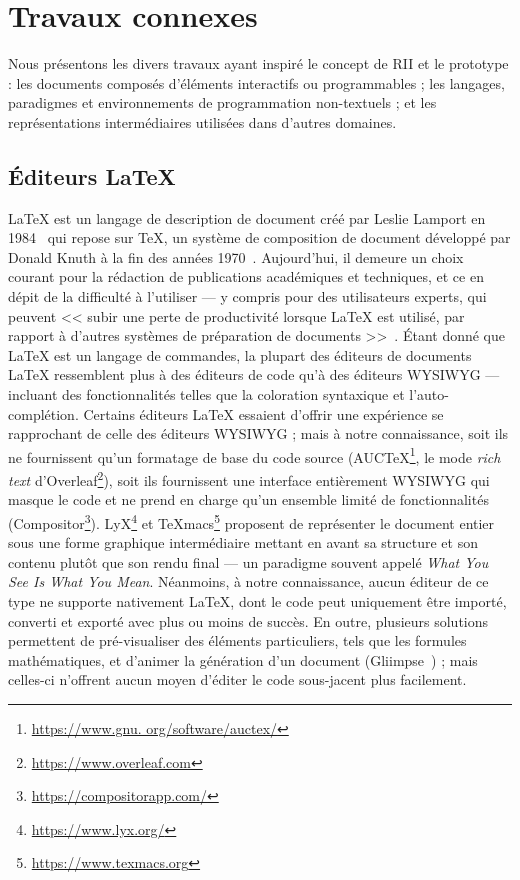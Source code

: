 
\section{Travaux connexes}
\label{sec:travaux-connexes}

Nous présentons les divers travaux ayant inspiré le concept de RII et le prototype \iLaTeX{} : les documents composés d'éléments interactifs ou programmables ; les langages, paradigmes et environnements de programmation non-textuels ; et les représentations intermédiaires utilisées dans d'autres domaines.


\subsection{Éditeurs \LaTeX{}}

\LaTeX{} est un langage de description de document créé par Leslie Lamport en 1984~\cite{lamport1994latex} qui repose sur \TeX{}, un système de composition de document développé par Donald Knuth à la fin des années 1970~\cite{knuth1984texbook}.
Aujourd'hui, il demeure un choix courant pour la rédaction de publications académiques et techniques, et ce en dépit de la difficulté à l'utiliser --- y compris pour des utilisateurs experts, qui peuvent << subir une perte de productivité lorsque \LaTeX{} est utilisé, par rapport à d'autres systèmes de préparation de documents >>~\cite{knauff2014efficiency}.
Étant donné que \LaTeX{} est un langage de commandes, la plupart des éditeurs de documents \LaTeX{} ressemblent plus à des éditeurs de code qu'à des éditeurs WYSIWYG --- incluant des fonctionnalités telles que la coloration syntaxique et l'auto-complétion.
Certains éditeurs \LaTeX{} essaient d'offrir une expérience se rapprochant de celle des éditeurs WYSIWYG ; mais à notre connaissance, soit ils ne fournissent qu'un formatage de base du code source (\eg AUC\TeX{}\footnote{\url{https://www.gnu. org/software/auctex/}}, le mode \emph{rich text} d'Overleaf\footnote{\url{https://www.overleaf.com}}), soit ils fournissent une interface entièrement WYSIWYG qui masque le code et ne prend en charge qu'un ensemble limité de fonctionnalités (\eg Compositor\footnote{\url{https://compositorapp.com/}}).
LyX\footnote{\url{https://www.lyx.org/}} et TeXmacs\footnote{\url{https://www.texmacs.org}} proposent de représenter le document entier sous une forme graphique intermédiaire mettant en avant sa structure et son contenu plutôt que son rendu final --- un paradigme souvent appelé \emph{What You See Is What You Mean}.
Néanmoins, à notre connaissance, aucun éditeur de ce type ne supporte nativement \LaTeX{}, dont le code peut uniquement être importé, converti et exporté avec plus ou moins de succès.
En outre, plusieurs solutions permettent de pré-visualiser des éléments particuliers, tels que les formules mathématiques, et d'animer la génération d'un document (\eg Gliimpse~\cite{dragicevic2011gliimpse}) ; mais celles-ci n'offrent aucun moyen d'éditer le code sous-jacent plus facilement.

